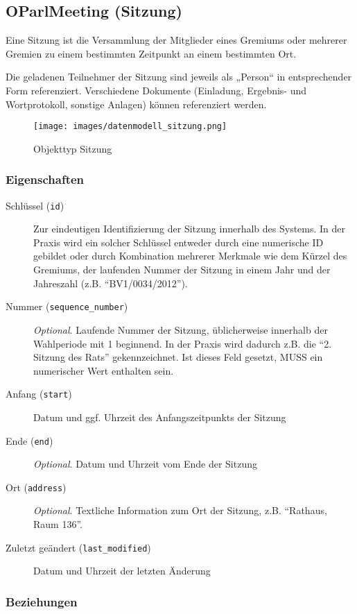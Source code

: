 \documentclass[,a4paper]{article}
\makeatletter
\def\maxwidth{\ifdim\Gin@nat@width>\linewidth\linewidth
\else\Gin@nat@width\fi}
\let\Oldincludegraphics\includegraphics
\renewcommand{\includegraphics}[1]{\Oldincludegraphics[width=\maxwidth]{#1}}
\makeatother
\begin{document}
\subsection{OParlMeeting (Sitzung)}

Eine Sitzung ist die Versammlung der Mitglieder eines Gremiums oder
mehrerer Gremien zu einem bestimmten Zeitpunkt an einem bestimmten Ort.

Die geladenen Teilnehmer der Sitzung sind jeweils als „Person`` in
entsprechender Form referenziert. Verschiedene Dokumente (Einladung,
Ergebnis- und Wortprotokoll, sonstige Anlagen) können referenziert
werden.

\begin{figure}[htbp]
\centering
\texttt{[image: images/datenmodell\_sitzung.png]}
\caption{Objekttyp Sitzung}
\end{figure}

\subsubsection{Eigenschaften}

\begin{description}
\item[Schlüssel (\texttt{id})]
Zur eindeutigen Identifizierung der Sitzung innerhalb des Systems. In
der Praxis wird ein solcher Schlüssel entweder durch eine numerische ID
gebildet oder durch Kombination mehrerer Merkmale wie dem Kürzel des
Gremiums, der laufenden Nummer der Sitzung in einem Jahr und der
Jahreszahl (z.B. ``BV1/0034/2012'').
\item[Nummer (\texttt{sequence\_number})]
\emph{Optional}. Laufende Nummer der Sitzung, üblicherweise innerhalb
der Wahlperiode mit 1 beginnend. In der Praxis wird dadurch z.B. die
``2. Sitzung des Rats'' gekennzeichnet. Ist dieses Feld gesetzt, MUSS
ein numerischer Wert enthalten sein.
\item[Anfang (\texttt{start})]
Datum und ggf. Uhrzeit des Anfangszeitpunkts der Sitzung
\item[Ende (\texttt{end})]
\emph{Optional}. Datum und Uhrzeit vom Ende der Sitzung
\item[Ort (\texttt{address})]
\emph{Optional}. Textliche Information zum Ort der Sitzung, z.B.
``Rathaus, Raum 136''.
\item[Zuletzt geändert (\texttt{last\_modified})]
Datum und Uhrzeit der letzten Änderung
\end{description}

\subsubsection{Beziehungen}
\end{document}
